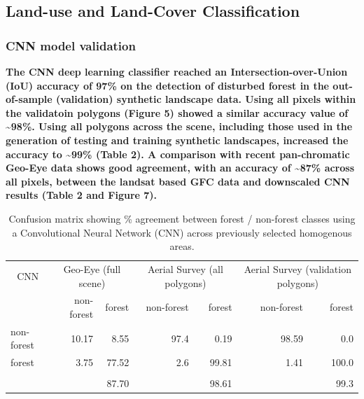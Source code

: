 \documentclass[remote sensing,article,submit,moreauthors,pdftex]{mdpi}
\begin{document}
\hypertarget{land-use-and-land-cover-classification}{%
\subsection{Land-use and Land-Cover
Classification}\label{land-use-and-land-cover-classification}}

\hypertarget{cnn-model-validation}{%
\subsubsection{CNN model validation}\label{cnn-model-validation}}

\textbf{The CNN deep learning classifier reached an
Intersection-over-Union (IoU) accuracy of 97\% on the detection of
disturbed forest in the out-of-sample (validation) synthetic landscape
data. Using all pixels within the validatoin polygons (Figure 5) showed
a similar accuracy value of \textasciitilde{}98\%. Using all polygons
across the scene, including those used in the generation of testing and
training synthetic landscapes, increased the accuracy to
\textasciitilde{}99\% (Table 2). A comparison with recent pan-chromatic
Geo-Eye data shows good agreement, with an accuracy of
\textasciitilde{}87\% across all pixels, between the landsat based GFC
data and downscaled CNN results (Table 2 and Figure 7).}

\begin{table}[!h]

\caption{\label{tab:unnamed-chunk-7}Confusion matrix showing \% agreement between forest / non-forest classes using a Convolutional Neural Network (CNN) across previously selected homogenous areas.}
\centering
\begin{tabular}[t]{lrrrrrr}
\toprule
\multicolumn{1}{c}{CNN} & \multicolumn{2}{c}{Geo-Eye (full scene)} & \multicolumn{2}{c}{Aerial Survey (all polygons)} & \multicolumn{2}{c}{Aerial Survey (validation polygons)} \\
\cmidrule(l{3pt}r{3pt}){1-1} \cmidrule(l{3pt}r{3pt}){2-3} \cmidrule(l{3pt}r{3pt}){4-5} \cmidrule(l{3pt}r{3pt}){6-7}
  & non-forest & forest & non-forest & forest & non-forest & forest\\
\midrule
non-forest & 10.17 & 8.55 & 97.4 & 0.19 & 98.59 & 0.0\\
forest & 3.75 & 77.52 & 2.6 & 99.81 & 1.41 & 100.0\\
\addlinespace[0.3em]
\multicolumn{7}{l}{\textbf{Accuracy}}\\
\hspace{1em} &  & 87.70 &  & 98.61 &  & 99.3\\
\bottomrule
\end{tabular}
\end{table}
\end{document}
